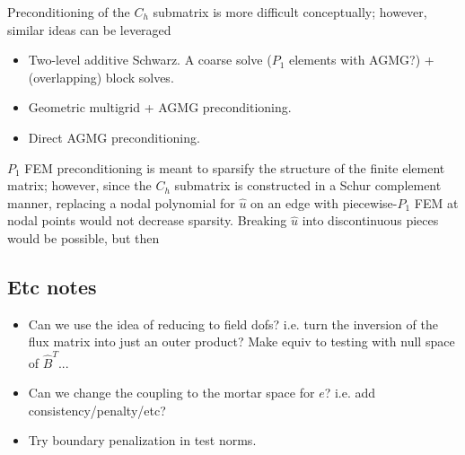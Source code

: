 \documentclass{article}
\newcommand{\uh}{\widehat{u}}
\begin{document}
Preconditioning of the $C_h$ submatrix is more difficult conceptually; however, similar ideas can be leveraged
\begin{itemize}
\item Two-level additive Schwarz.  A coarse solve ($P_1$ elements with AGMG?) + (overlapping) block solves. 
\item Geometric multigrid + AGMG preconditioning.
\item Direct AGMG preconditioning.  
\end{itemize}
$P_1$ FEM preconditioning is meant to sparsify the structure of the finite element matrix; however, since the $C_h$ submatrix is constructed in a Schur complement manner, replacing a nodal polynomial for $\uh$ on an edge with piecewise-$P_1$ FEM at nodal points would not decrease sparsity.  Breaking $\uh$ into discontinuous pieces would be possible, but then 

\subsection{Etc notes}
\begin{itemize}
\item Can we use the idea of reducing to field dofs?  i.e. turn the inversion of the flux matrix into just an outer product?  Make equiv to testing with null space of $\hat{B}^T$...
\item Can we change the coupling to the mortar space for $e$?  i.e. add consistency/penalty/etc?
\item Try boundary penalization in test norms.  
\end{itemize}
\end{document}
